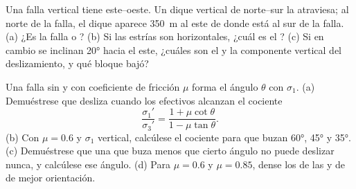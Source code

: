 \begin{exercise}[$\star\star$]\label{exo:b1:faults-folds-fabrics:9}
Una falla vertical tiene  este--oeste. Un dique vertical de  norte--sur la atraviesa; al norte de la falla, el dique aparece
\qty{350}{m} al este de donde está al sur de la falla. (a) ¿Es la falla  o ? (b) Si las estrías son horizontales,
¿cuál es el ? (c) Si en cambio se inclinan \ang{20} hacia el este, ¿cuáles son el  y la componente
vertical del deslizamiento, y qué bloque bajó?
\end{exercise}

\begin{exercise}[$\star\star\star$]\label{exo:b1:faults-folds-fabrics:10}
Una falla sin  y con coeficiente de fricción $\mu$ forma el ángulo $\theta$ con $\sigma_1$. (a) Demuéstrese que desliza
cuando los  efectivos alcanzan el cociente
\[
  \frac{\sigma_1'}{\sigma_3'} = \frac{1 + \mu\cot\theta}{1 - \mu\tan\theta} .
\]
(b) Con $\mu = 0.6$ y $\sigma_1$ vertical, calcúlese el cociente para  que buzan \ang{60}, \ang{45} y \ang{35}.
(c) Demuéstrese que una  que buza menos que cierto ángulo no puede deslizar nunca, y calcúlese ese ángulo. (d) Para
$\mu = 0.6$ y $\mu = 0.85$, dense los  de las  y de  de mejor orientación.
\end{exercise}

